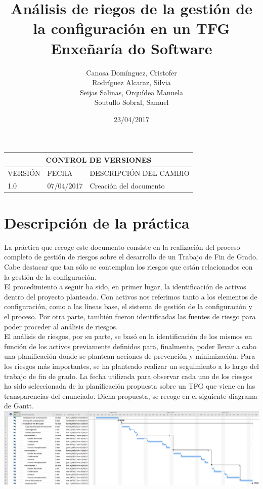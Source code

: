 \documentclass[10pt,a4paper]{article}
\author{Canosa Domínguez, Cristofer \\ Rodríguez Alcaraz, Silvia \\ Seijas Salinas, Orquídea Manuela \\ Soutullo Sobral, Samuel}
\title{Análisis de riegos de la gestión de la configuración en un TFG \\ \large Enxeñaría do Software}
\date{23/04/2017}
\begin{document}
	\maketitle %
	\newpage
	\begin{table}[htb]
    	\centering
    	\begin{tabular}{|l|l|l|}
   			\hline
    		\multicolumn{3}{|c|}{CONTROL DE VERSIONES} \\ \hline
    		VERSIÓN & FECHA & DESCRIPCIÓN DEL CAMBIO\\
    		\hline \hline
    		1.0 & 07/04/2017 & Creación del documento \\ \hline
    	\end{tabular}   
    \end{table}
	\newpage
	\tableofcontents
	\newpage
	\pagestyle{fancy}
	\section{Descripción de la práctica}
	La práctica que recoge este documento consiste en la realización del proceso completo de gestión de riesgos sobre el desarrollo de un Trabajo de Fin de Grado. Cabe destacar que tan sólo se contemplan los riesgos que están relacionados con la gestión de la configuración.\\
	
	El procedimiento a seguir ha sido, en primer lugar, la identificación de activos dentro del proyecto planteado. Con activos nos referimos tanto a los elementos de configuración, como a las líneas base, el sistema de gestión de la configuración y el proceso. Por otra parte, también fueron identificadas las fuentes de riesgo para poder proceder al análisis de riesgos.\\
	
	El análisis de riesgos, por su parte, se basó en la identificación de los mismos en función de los activos previamente definidos para, finalmente, poder llevar a cabo una planificación donde se plantean acciones de prevención y  minimización. Para los riesgos más importantes, se ha planteado realizar un seguimiento a lo largo del trabajo de fin de grado. La fecha utilizada para observar cada uno de los riesgos ha sido seleccionada de la planificación propuesta sobre un TFG que viene en las transparencias del enunciado. Dicha propuesta, se recoge en el siguiente diagrama de Gantt. \\
	
	\includegraphics[scale=0.3]{imagenes/tfg.png}
		
\end{document}

